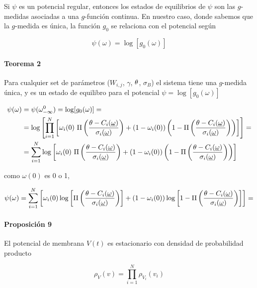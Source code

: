 Si $\psi$ es un potencial regular, entonces los estados de equilibrios de $\psi$ son las $g$-medidas asociadas a una $g$-función continua. En nuestro caso, donde sabemos que la $g$-medida es única, la función $g_0$ se relaciona con el potencial según

\begin{equation}
    \psi(\omega) = \log[g_0(\omega)]
\end{equation}


\paragraph{Teorema 2} Para cualquier set de parámetros ($W_{i,j}$, $\gamma$, $\theta$,
$\sigma_B$) el sistema tiene una $g$-medida única, y es un estado de equilibro
para el potencial $\psi=\log[g_0(\omega)]$



\begin{align*}
  \psi(\omega) & = \psi(\omega_{-\infty}^0)=\log[g_0(\omega)]= \\
  & = \log\left[\prod_{i=1}^N\left[\omega_i(0) \ \Pi\left(\frac{\theta-C_i(\uom)}{\sigma_i(\uom)}\right)+(1-\omega_i(0))\left(1-\Pi\left(\frac{\theta-C_i(\uom)}{\sigma_i(\uom)}\right)\right)\right]\right] = \\
  & = \sum_{i=1}^N \log\left[\omega_i(0) \ \Pi\left(\frac{\theta-C_i(\uom)}{\sigma_i(\uom)}\right)+(1-\omega_i(0))\left(1-\Pi\left(\frac{\theta-C_i(\uom)}{\sigma_i(\uom)}\right)\right)\right]
\end{align*}

como $\omega(0)$ es 0 o 1,

\begin{equation}
  \psi(\omega) = 
  \sum_{i=1}^N \left[\omega_i(0) \log\left[ \Pi\left(\frac{\theta-C_i(\underline{\omega})}{\sigma_i(\underline{\omega})}\right)\right]+(1-\omega_i(0))\log\left[1-\Pi\left(\frac{\theta-C_i(\underline{\omega})}{\sigma_i(\underline{\omega})}\right)\right]\right] =
  \label{potencailnu}
\end{equation}


\paragraph{Proposición 9} El potencial de membrana $V(t)$ es estacionario con densidad de probabilidad producto

\begin{equation*}
  \rho_V(v) = \prod_{i=1}^N \rho_{V_i}(v_i) 
\end{equation*}

